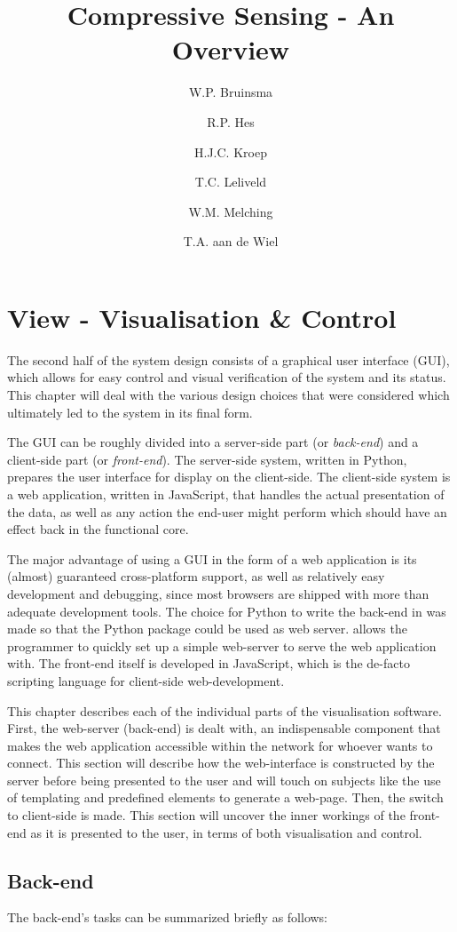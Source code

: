 \documentclass[a4paper, openany, oneside]{memoir}
\title{Compressive Sensing - An Overview}
\author{W.P. Bruinsma \and R.P. Hes \and H.J.C. Kroep \and T.C. Leliveld \and W.M. Melching \and T.A. aan de Wiel}
\begin{document}
\chapter{View - Visualisation \& Control}
\label{ch:visualisation}
The second half of the system design consists of a graphical user interface (GUI), which allows for easy control and visual verification of the system and its status. This chapter will deal with the various design choices that were considered which ultimately led to the system in its final form.

The GUI can be roughly divided into a server-side part (or \emph{back-end}) and a client-side part (or \emph{front-end}). The server-side system, written in Python, prepares the user interface for display on the client-side. The client-side system is a web application, written in JavaScript, that handles the actual presentation of the data, as well as any action the end-user might perform which should have an effect back in the functional core.

The major advantage of using a GUI in the form of a web application is its (almost) guaranteed cross-platform support, as well as relatively easy development and debugging, since most browsers are shipped with more than adequate development tools.
The choice for Python to write the back-end in was made so that the  Python package could be used as web server.  allows the programmer to quickly set up a simple web-server to serve the web application with.
The front-end itself is developed in JavaScript, which is the de-facto scripting language for client-side web-development.

This chapter describes each of the individual parts of the visualisation software.
First, the web-server (back-end) is dealt with, an indispensable component that makes the web application accessible within the network for whoever wants to connect. This section will describe how the web-interface is constructed by the server before being presented to the user and will touch on subjects like the use of templating and predefined elements to generate a web-page.
Then, the switch to client-side is made. This section will uncover the inner workings of the front-end as it is presented to the user, in terms of both visualisation and control.

\section{Back-end}
\label{sec:webserver}
The back-end's tasks can be summarized briefly as follows:
\end{document}
